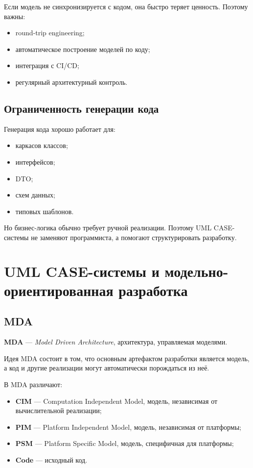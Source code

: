 \documentclass[12pt,a4paper]{article}
\begin{document}
Если модель не синхронизируется с кодом, она быстро теряет ценность. Поэтому важны:
\begin{itemize}
    \item round-trip engineering;
    \item автоматическое построение моделей по коду;
    \item интеграция с CI/CD;
    \item регулярный архитектурный контроль.
\end{itemize}

\subsection{Ограниченность генерации кода}

Генерация кода хорошо работает для:
\begin{itemize}
    \item каркасов классов;
    \item интерфейсов;
    \item DTO;
    \item схем данных;
    \item типовых шаблонов.
\end{itemize}

Но бизнес-логика обычно требует ручной реализации. Поэтому UML CASE-системы не заменяют программиста, а помогают структурировать разработку.

\section{UML CASE-системы и модельно-ориентированная разработка}

\subsection{MDA}

\textbf{MDA} --- \textit{Model Driven Architecture}, архитектура, управляемая моделями.

Идея MDA состоит в том, что основным артефактом разработки является модель, а код и другие реализации могут автоматически порождаться из неё.

В MDA различают:
\begin{itemize}
    \item \textbf{CIM} --- Computation Independent Model, модель, независимая от вычислительной реализации;
    \item \textbf{PIM} --- Platform Independent Model, модель, независимая от платформы;
    \item \textbf{PSM} --- Platform Specific Model, модель, специфичная для платформы;
    \item \textbf{Code} --- исходный код.
\end{itemize}
\end{document}
